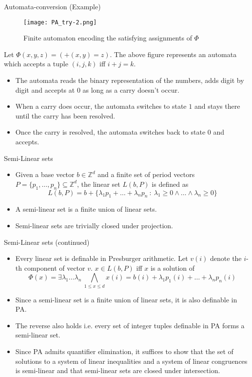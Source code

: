 \documentclass[10pt]{beamer}
\begin{document}
\begin{frame}{Automata-conversion (Example)}
   \begin{figure}[h!]
   \texttt{[image: PA\_try-2.png]}
   \caption{Finite automaton encoding the satisfying assignments of $\Phi$}
   \end{figure}
   Let $\Phi(x,y,z)= (+(x,y)=z)$. The above figure represents an automata which accepts a tuple $(i,j,k)$ iff $i+j=k$. 
   \begin{itemize}
   \item The automata reads the binary representation of the numbers, adds digit by digit 
   and accepts at $0$ as long as a carry doesn't occur. 
   \item When a carry does occur, the automata switches to state $1$ and stays there until the carry has been resolved.
   \item Once the carry is resolved, the automata switches back to state $0$ and accepts.
\end{itemize}
\end{frame}
\begin{frame}{Semi-Linear sets}
    \begin{itemize}
        \item Given a base vector $b\in \mathbb{Z}^d$ and a finite set of period vectors $P=\{p_1,\dots ,p_n\}\subseteq \mathbb{Z}^d$,
        the linear set $L(b,P)$ is defined as 
        \[ L(b,P)=b+\{\lambda_1p_1+\dots +\lambda_np_n\:: \:\lambda_1\geq0\wedge \dots \wedge \lambda_n\geq 0\}\]
        \item A semi-linear set is a finite union of linear sets.
        \item Semi-linear sets are trivially closed under projection.
    \end{itemize}
\end{frame}
\begin{frame}{Semi-Linear sets (continued)}
    \begin{itemize}
        \item Every linear set is definable in Presburger arithmetic. 
        Let $v(i)$ denote the $i$-th component of vector $v$. $x\in L(b,P)$ iff $x$ is a solution of
        \[\Phi(x)=\exists \lambda_1\dots \lambda_n\:\bigwedge_{1\leq x\leq d} x(i)=b(i)+\lambda_1p_1(i)+\dots+\lambda_np_n(i)\]
        \item Since a semi-linear set is a finite union of linear sets, it is also definable in PA.
        \item The reverse also holds i.e. every set of integer tuples definable in PA forms a semi-linear set.
        \item Since PA admits quantifier elimination, it suffices to show that the set of solutions to a system of linear
        inequalities and a system of linear congruences is semi-linear and that semi-linear sets are closed under intersection.
    \end{itemize}
\end{frame}
\end{document}
